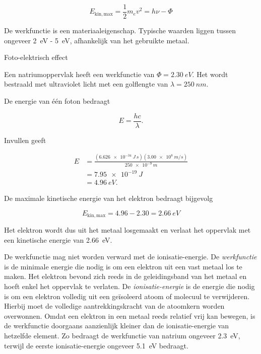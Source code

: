 \begin{equation}
\boxed{
E_{\mathrm{kin,max}} = \frac{1}{2}m_ev^2  = h\nu-\Phi}
\end{equation}

De werkfunctie is een materiaaleigenschap. Typische waarden liggen tussen ongeveer \SI{2}{\electronvolt} - \SI{5}{\electronvolt}, afhankelijk van het gebruikte metaal.

\begin{voorbeeld}{Foto-elektrisch effect}

Een natriumoppervlak heeft een werkfunctie van
$\Phi=\SI{2.30}{eV}$.
Het wordt bestraald met ultraviolet licht met een golflengte van
$\lambda=\SI{250}{nm}$.

De energie van één foton bedraagt

\begin{equation*}
E=\frac{hc}{\lambda}.
\end{equation*}

Invullen geeft

\begin{align*}
E
&=
\frac{(\SI{6.626e-34}{J\,s})
(\SI{3.00e8}{m/s})}
{\SI{250e-9}{m}}
\\
&=
\SI{7.95e-19}{J}
\\
&=
\SI{4.96}{eV}.
\end{align*}

De maximale kinetische energie van het elektron bedraagt bijgevolg

\[
E_{\mathrm{kin,max}}
=
4.96-2.30
=
\SI{2.66}{eV}
\]

Het elektron wordt dus uit het metaal losgemaakt en verlaat het oppervlak met een kinetische energie van \SI{2.66}{eV}.

\end{voorbeeld}

De werkfunctie mag niet worden verward met de ionisatie-energie. De \emph{werkfunctie} is de minimale energie die nodig is om een elektron uit een vast metaal los te maken. Het elektron bevond zich reeds in de geleidingsband van het metaal en hoeft enkel het oppervlak te verlaten. De \emph{ionisatie-energie} is de energie die nodig is om een elektron volledig uit een geïsoleerd atoom of molecuul te verwijderen. Hierbij moet de volledige aantrekkingskracht van de atoomkern worden overwonnen. Omdat een elektron in een metaal reeds relatief vrij kan bewegen, is de werkfunctie doorgaans aanzienlijk kleiner dan de ionisatie-energie van hetzelfde element. Zo bedraagt de werkfunctie van natrium ongeveer \SI{2.3}{eV}, terwijl de eerste ionisatie-energie ongeveer \SI{5.1}{eV} bedraagt.

